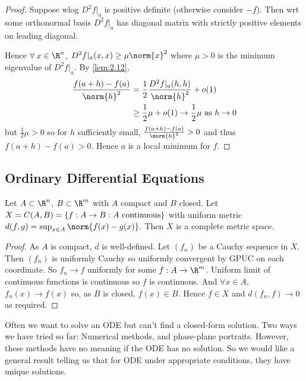 \begin{proof}
    Suppose wlog $D^2f|_a$ is positive definite (otherwise consider $-f$). 
    Then wrt some orthonormal basis $D^2f|_a$ has diagonal matrix with strictly positive elements on leading diagonal. 

    Hence $\forall \; x \in \R^n$, $D^2f|_a(x,x) \ge \mu\norm{x}^2$ where $\mu > 0$ is the minimum eigenvalue of $D^2f|_a$. 
    By \cref{lem:2.12},
    \begin{align*}
        \frac{f(a+h) - f(a)}{\norm{h}^2} &= \frac{1}{2} \frac{D^2f|_a(h,h)}{\norm{h}^2} + o(1)\\
        &\ge \frac{1}{2} \mu + o(1) \to \frac{1}{2} \mu \textup{ as } h\to 0
    \end{align*}
    but $\frac{1}{2}\mu > 0$ so for $h$ sufficiently small, $\frac{f(a+h) - f(a)}{\norm{h}^2}>0$ and thus $f(a+h) - f(a) > 0$. 
    Hence $a$ is a local minimum for $f$.
\end{proof}

\subsection{Ordinary Differential Equations}
\begin{lemma} \label{lem:2.14}
    Let $A\subset\R^n$, $B\subset\R^m$ with $A$ compact and $B$ closed. Let $X = C(A,B) = \{f:A\to B : A \textup{ continuous}\}$ with uniform metric $d(f,g) = \sup_{x\in A} \norm{f(x)-g(x)}.$ Then $X$ is a complete metric space.
\end{lemma}

\begin{proof}
    As $A$ is compact, $d$ is well-defined. 
    Let $(f_n)$ be a Cauchy sequence in $X$. 
    Then $(f_n)$ is uniformly Cauchy so uniformly convergent by GPUC on each coordinate. 
    So $f_n\to f$ uniformly for some $f: A \to \R^m$. 
    Uniform limit of continuous functions is continuous so $f$ is continuous. 
    And $\forall x \in A$, $f_n(x) \to f(x)$ so, as $B$ is closed, $f(x) \in B$. 
    Hence $f \in X$ and $d(f_n,f) \to 0$ as required.
\end{proof}

Often we want to solve an ODE but can't find a closed-form solution. Two ways we have tried so far: Numerical methods, and phase-plane portraits. However, these methods have no meaning if the ODE has no solution. So we would like a general result telling us that for ODE under appropriate conditions, they have unique solutions.

